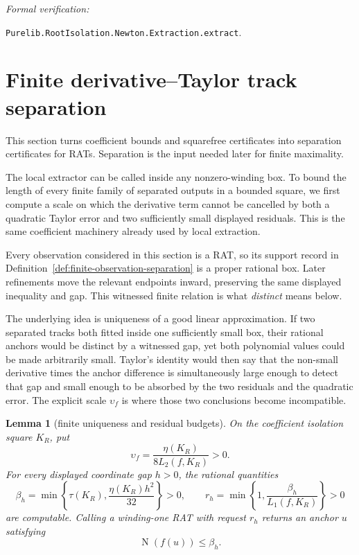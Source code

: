 \documentclass[11pt]{article}
\newtheorem{lemma}[theorem]{Lemma}
\newcommand{\Norm}[1]{\operatorname{N}\!\left(#1\right)}
\newcommand{\Defref}[1]{Definition~\ref{#1}}
\newcommand{\leanref}[1]{\par\smallskip\noindent
  \emph{Formal verification:}\par\nobreak
  {\raggedright\nolinkurl{#1}.\par}}
\begin{document}
\leanref{Purelib.RootIsolation.Newton.Extraction.extract}

\section{Finite derivative--Taylor track separation}
\label{sec:track-separation}

This section turns coefficient bounds and squarefree certificates into
separation certificates for RATs.  Separation is the input needed later for
finite maximality.

The local extractor can be called inside any nonzero-winding box.  To
bound the length of every finite family of separated outputs in a bounded
square, we first compute a scale on which the derivative term cannot be
cancelled by both a quadratic Taylor error and two sufficiently small
displayed residuals.  This is the same coefficient machinery already used
by local extraction.

Every observation considered in this section is a RAT, so its support record
in \Defref{def:finite-observation-separation} is a proper rational box.
Later refinements move the relevant endpoints inward, preserving the same
displayed inequality and gap.  This witnessed finite relation is what
\emph{distinct} means below.

The underlying idea is uniqueness of a good linear approximation.  If two
separated tracks both fitted inside one sufficiently small box, their
rational anchors would be distinct by a witnessed gap, yet both polynomial
values could be made arbitrarily small.  Taylor's identity would then say
that the non-small derivative times the anchor difference is simultaneously
large enough to detect that gap and small enough to be absorbed by the two
residuals and the quadratic error.  The explicit scale $\upsilon_f$ is where
those two conclusions become incompatible.

\begin{lemma}[finite uniqueness and residual budgets]
\label{lem:separation-budgets}
On the coefficient isolation square $K_R$, put
\[
 \upsilon_f=
 \frac{\eta(K_R)}{8L_2(f,K_R)}>0.
\]
For every displayed coordinate gap $h>0$, the rational quantities
\[
 \beta_h=\min\left\{\tau(K_R),
        \frac{\eta(K_R)h^2}{32}\right\}>0,
 \qquad
 r_h=\min\left\{1,\frac{\beta_h}{L_1(f,K_R)}\right\}>0
\]
are computable.  Calling a winding-one RAT with request $r_h$ returns an
anchor $u$ satisfying
\[
                         \Norm{f(u)}\le\beta_h.
\]
\end{lemma}
\end{document}
